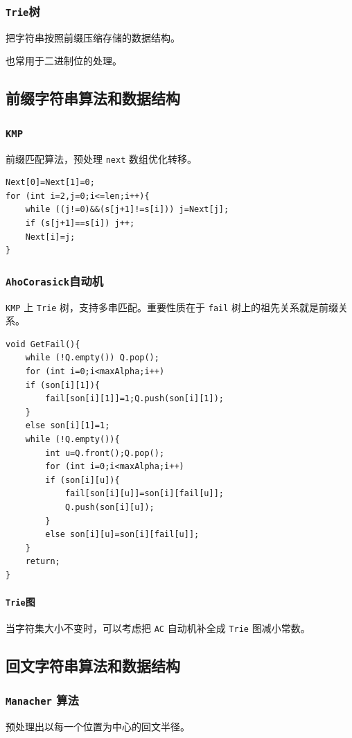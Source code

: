\documentclass[UTF-8]{ctexart}
\begin{document}
	\subsubsection{\texttt{Trie}树}
	把字符串按照前缀压缩存储的数据结构。
	
	也常用于二进制位的处理。
	\subsection{前缀字符串算法和数据结构}
	\subsubsection{\texttt{KMP}}
	前缀匹配算法，预处理 \texttt{next} 数组优化转移。
\begin{verbatim}
Next[0]=Next[1]=0;
for (int i=2,j=0;i<=len;i++){
    while ((j!=0)&&(s[j+1]!=s[i])) j=Next[j];
    if (s[j+1]==s[i]) j++;
    Next[i]=j;
}
\end{verbatim}

	\subsubsection{\texttt{AhoCorasick}自动机}
	\texttt{KMP} 上 \texttt{Trie} 树，支持多串匹配。重要性质在于 \texttt{fail} 树上的祖先关系就是前缀关系。
	
\begin{verbatim}
void GetFail(){
    while (!Q.empty()) Q.pop();
    for (int i=0;i<maxAlpha;i++)
    if (son[i][1]){
        fail[son[i][1]]=1;Q.push(son[i][1]);
    }
    else son[i][1]=1;
    while (!Q.empty()){
        int u=Q.front();Q.pop();
        for (int i=0;i<maxAlpha;i++)
        if (son[i][u]){
            fail[son[i][u]]=son[i][fail[u]];
            Q.push(son[i][u]);
        }
        else son[i][u]=son[i][fail[u]];
    }
    return;
}
\end{verbatim}
	\paragraph{\texttt{Trie}图} 当字符集大小不变时，可以考虑把 \texttt{AC} 自动机补全成 \texttt{Trie} 图减小常数。
	\subsection{回文字符串算法和数据结构}
	\subsubsection{\texttt{Manacher} 算法}
	预处理出以每一个位置为中心的回文半径。
	
\end{document}
